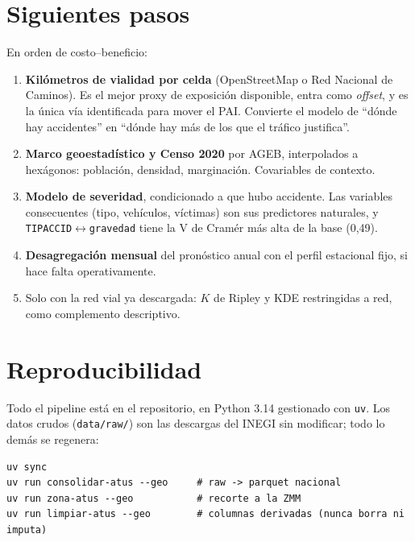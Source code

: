 \documentclass[11pt,a4paper]{article}
\begin{document}
\section{Siguientes pasos}

En orden de costo--beneficio:

\begin{enumerate}[leftmargin=1.4em]
\item \textbf{Kilómetros de vialidad por celda} (OpenStreetMap o Red Nacional
  de Caminos). Es el mejor proxy de exposición disponible, entra como
  \emph{offset}, y es la única vía identificada para mover el PAI. Convierte el
  modelo de ``dónde hay accidentes'' en ``dónde hay más de los que el tráfico
  justifica''.
\item \textbf{Marco geoestadístico y Censo 2020} por AGEB, interpolados a
  hexágonos: población, densidad, marginación. Covariables de contexto.
\item \textbf{Modelo de severidad}, condicionado a que hubo accidente. Las
  variables consecuentes (tipo, vehículos, víctimas) son sus predictores
  naturales, y \texttt{TIPACCID}$\leftrightarrow$\texttt{gravedad} tiene la V de
  Cramér más alta de la base (0,49).
\item \textbf{Desagregación mensual} del pronóstico anual con el perfil
  estacional fijo, si hace falta operativamente.
\item Solo con la red vial ya descargada: $K$ de Ripley y KDE restringidas a
  red, como complemento descriptivo.
\end{enumerate}

\appendix
\section{Reproducibilidad}

Todo el pipeline está en el repositorio, en Python 3.14 gestionado con
\texttt{uv}. Los datos crudos (\texttt{data/raw/}) son las descargas del INEGI
sin modificar; todo lo demás se regenera:

\begin{verbatim}
uv sync
uv run consolidar-atus --geo     # raw -> parquet nacional
uv run zona-atus --geo           # recorte a la ZMM
uv run limpiar-atus --geo        # columnas derivadas (nunca borra ni imputa)
\end{verbatim}
\end{document}
